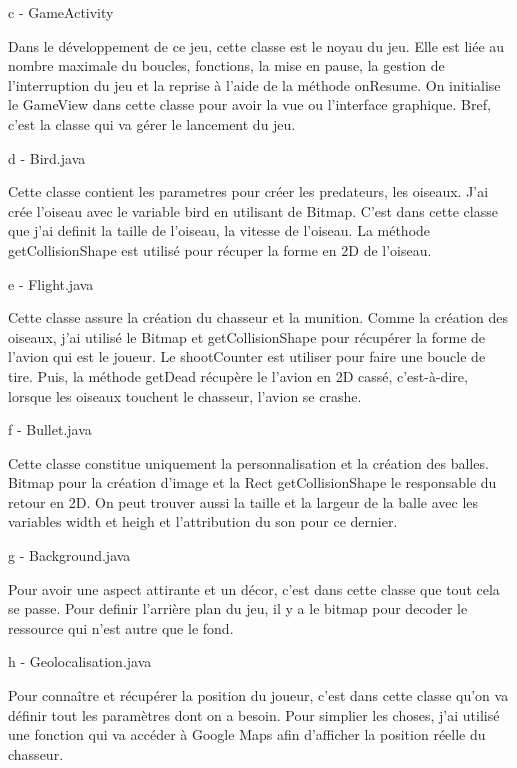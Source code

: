 \documentclass{rapportECL}
\begin{document}
c - GameActivity

Dans le développement de ce jeu, cette classe est le noyau du jeu. Elle est liée au nombre maximale du boucles, fonctions, la mise en pause, la gestion de l'interruption du jeu et la reprise à l'aide de la méthode onResume. On initialise le GameView dans cette classe pour avoir la vue ou l'interface graphique. Bref, c'est la classe qui va gérer le lancement du jeu. \newline

d - Bird.java

Cette classe contient les parametres pour créer les predateurs, les oiseaux. J'ai crée l'oiseau avec le variable bird en utilisant de Bitmap. C'est dans cette classe que j'ai definit la taille de l'oiseau, la vitesse de l'oiseau. La méthode getCollisionShape est utilisé pour récuper la forme en 2D de l'oiseau. \newline

e - Flight.java

Cette classe assure la création du chasseur et la munition. Comme la création des oiseaux, j'ai utilisé le Bitmap et getCollisionShape pour récupérer la forme de l'avion qui est le joueur. Le shootCounter est utiliser pour faire une boucle de tire. Puis, la méthode getDead récupère le l'avion en 2D cassé, c'est-à-dire, lorsque les oiseaux touchent le chasseur, l'avion se crashe.\newline

f - Bullet.java

Cette classe constitue uniquement la personnalisation et la création des balles. Bitmap pour la création d'image et la Rect getCollisionShape le responsable du retour en 2D. On peut trouver aussi la taille et la largeur de la balle avec les variables width et heigh et l'attribution du son\cite{Son} pour ce dernier. \newline

g - Background.java

Pour avoir une aspect attirante et un décor, c'est dans cette classe que tout cela se passe. Pour definir l'arrière plan du jeu, il y a le bitmap pour decoder le ressource qui n'est autre que le fond\cite{Images}.\newline

h - Geolocalisation.java

Pour connaître et récupérer la position du joueur, c'est dans cette classe qu'on va définir tout les paramètres\cite{AndroidStudio} dont on a besoin. Pour simplier les choses, j'ai utilisé une fonction qui va accéder à Google Maps afin d'afficher la position réelle du chasseur.\newline
\end{document}

